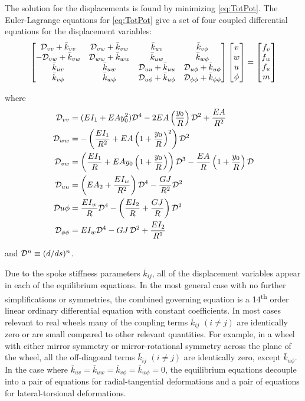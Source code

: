 \documentclass[\rootdir/thesis.tex]{subfiles}
\begin{document}
The solution for the displacements is found by minimizing \eqref{eq:TotPot}. The Euler-Lagrange equations for \eqref{eq:TotPot} give a set of four coupled differential equations for the displacement variables:
\begin{equation}
\label{eq:EulerLagrange}
\begin{bmatrix}
 \mathcal{D}_{vv} + \bar{k}_{vv} & \mathcal{D}_{vw} + \bar{k}_{vw} & \bar{k}_{uv}              & \bar{k}_{v\phi}\\
-\mathcal{D}_{vw} + \bar{k}_{vw} & \mathcal{D}_{ww} + \bar{k}_{ww} & \bar{k}_{uw}              & \bar{k}_{w\phi}\\
\bar{k}_{uv}            & \bar{k}_{uw}           & \mathcal{D}_{uu} + \bar{k}_{uu}    & \mathcal{D}_{u\phi} + \bar{k}_{u\phi}\\
\bar{k}_{v\phi}            & \bar{k}_{w\phi}           & \mathcal{D}_{u\phi} + \bar{k}_{u\phi} & \mathcal{D}_{\phi\phi} + \bar{k}_{\phi\phi}
\end{bmatrix}
\begin{bmatrix}
v\\w\\u\\\phi
\end{bmatrix}=
\begin{bmatrix}
f_v\\f_w\\f_u\\m
\end{bmatrix}
\end{equation}

where
\begin{align*}
\mathcal{D}_{vv} &= (EI_1 + EAy_0^2)\mathcal{D}^4 - 2EA\left(\frac{y_0}{R}\right)\mathcal{D}^2 + \frac{EA}{R^2}\\
\mathcal{D}_{ww} &= -\left(\frac{EI_1}{R^2} + EA\left(1+\frac{y_0}{R}\right)^2\right)\mathcal{D}^2\\
\mathcal{D}_{vw} &= \left(\frac{EI_1}{R} + EAy_0\left(1+\frac{y_0}{R}\right)\right)\mathcal{D}^3 - \frac{EA}{R}\left(1+\frac{y_0}{R}\right)\mathcal{D}\\
\mathcal{D}_{uu} &= \left(EA_2 + \frac{EI_w}{R^2}\right)\mathcal{D}^4 - \frac{GJ}{R^2}\mathcal{D}^2\\
\mathcal{D} {u\phi} &= \frac{EI_w}{R}\mathcal{D}^4 - \left(\frac{EI_2}{R} + \frac{GJ}{R}\right)\mathcal{D}^2\\
\mathcal{D}_{\phi\phi} &= EI_w\mathcal{D}^4 - GJ\,\mathcal{D}^2 + \frac{EI_2}{R^2}
\end{align*}

and $\mathcal{D}^n \equiv (d/ds)^n$.

Due to the spoke stiffness parameters $\bar{k}_{ij}$, all of the displacement variables appear in each of the equilibrium equations. In the most general case with no further simplifications or symmetries, the combined governing equation is a 14\textsuperscript{th} order linear ordinary differential equation with constant coefficients. In most cases relevant to real wheels many of the coupling terms $\bar{k}_{ij}$ $(i \neq j)$ are identically zero or are small compared to other relevant quantities. For example, in a wheel with either mirror symmetry or mirror-rotational symmetry across the plane of the wheel, all the off-diagonal terms $\bar{k}_{ij}$ $(i \neq j)$ are identically zero, except $\bar{k}_{u\phi}$. In the case where $\bar{k}_{uv}=\bar{k}_{uw}=\bar{k}_{v\phi}=\bar{k}_{w\phi}=0$, the equilibrium equations decouple into a pair of equations for radial-tangential deformations and a pair of equations for lateral-torsional deformations.
\end{document}
